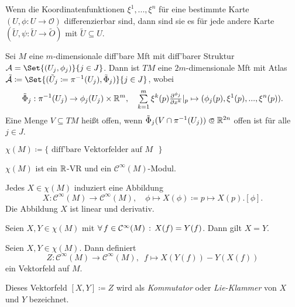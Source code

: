 \documentclass{cheat-sheet}
\renewcommand{\O}{\mathcal{O}} %
\newcommand{\A}{\mathcal{A}} %
\begin{document}
\begin{lem}
  Wenn die Koordinatenfunktionen $\xi^1, ..., \xi^n$ für eine bestimmte Karte $(U, \phi : U \to \O)$ differenzierbar sind, dann sind sie es für jede andere Karte $(\tilde{U}, \psi : \tilde{U} \to \tilde{O})$ mit $\tilde{U} \subseteq U$.
\end{lem}

\begin{defn}
  Sei $M$ eine $m$-dimensionale diff'bare Mft mit diff'barer Struktur $\A = \Set{(U_j, \phi_j)}{j \in J}$. Dann ist $TM$ eine $2m$-dimensionale Mft mit Atlas $\tilde{\A} \coloneqq \Set{(\tilde{U}_j \coloneqq \pi^{-1}(U_j), \tilde{\Phi}_j)}{j \in J}$, wobei
  \[
    \tilde{\Phi}_j : \pi^{-1}(U_j) \to \phi_j(U_j) \times \R^m, \quad
    \sum_{k=1}^m \xi^k(p) \tfrac{\partial^{\phi_j}}{\partial x^k}|_p \mapsto (\phi_j(p), \xi^1(p), ..., \xi^n(p)).
  \]
  Eine Menge $V \subseteq TM$ heißt offen, wenn $\tilde{\Phi}_j(V \cap \pi^{-1}(U_j)) \opn \R^{2n}$ offen ist für alle $j \in J$.
\end{defn}

\begin{nota}
  $\chi(M) \coloneqq \{\text{ diff'bare Vektorfelder auf $M$ }\}$
\end{nota}

\begin{bem}
  $\chi(M)$ ist ein $\mathbb{R}$-VR und ein $\mathcal{C}^\infty(M)$-Modul.
\end{bem}

\begin{lem}
  Jedes $X \in \chi(M)$ induziert eine Abbildung
  \[
    X : \mathcal{C}^\infty(M) \to \mathcal{C}^\infty(M), \quad
    \phi \mapsto X(\phi) \coloneqq p \mapsto X(p) . [\phi].
  \]
  Die Abbildung $X$ ist linear und derivativ.
\end{lem}

\begin{lem}
  Seien $X, Y \in \chi(M)$ mit $\forall \, {f \in \mathcal{C}^\infty(M)} \,:\, X(f) = Y(f)$. Dann gilt $X = Y$.
\end{lem}

\begin{lem}
  Seien $X, Y \in \chi(M)$. Dann definiert
  \[
    Z : \mathcal{C}^\infty(M) \to \mathcal{C}^\infty(M), \enspace
    f \mapsto X(Y(f)) - Y(X(f))
  \]
  ein Vektorfeld auf $M$.
\end{lem}

\begin{defn}
  Dieses Vektorfeld $[X, Y] \coloneqq Z$ wird als \emph{Kommutator} oder \emph{Lie-Klammer} von $X$ und $Y$ bezeichnet.
\end{defn}
\end{document}
